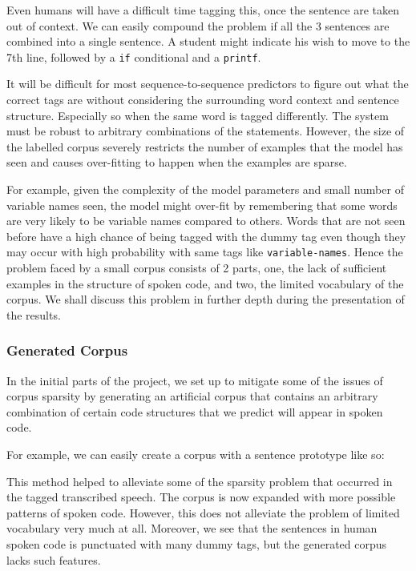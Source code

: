\documentclass[fyp]{socreport}
\begin{document}
Even humans will have a difficult time tagging this, once the sentence are
taken out of context. We can easily compound the problem if all the 3 sentences
are combined into a single sentence. A student might indicate his wish to move
to the 7th line, followed by a \texttt{if} conditional and a \texttt{printf}.

It will be difficult for most sequence-to-sequence predictors to figure out
what the correct tags are without considering the surrounding word context and
sentence structure. Especially so when the same word is tagged differently. The
system must be robust to arbitrary combinations of the statements. However, the
size of the labelled corpus severely restricts the number of examples that the
model has seen and causes over-fitting to happen when the examples are sparse.

For example, given the complexity of the model parameters and small number of
variable names seen, the model might over-fit by remembering that some words
are very likely to be variable names compared to others. Words that are not
seen before have a high chance of being tagged with the dummy tag even though
they may occur with high probability with same tags like
\texttt{variable-names}. Hence the problem faced by a small corpus consists of
2 parts, one, the lack of sufficient examples in the structure of spoken code,
and two, the limited vocabulary of the corpus.  We shall discuss this problem
in further depth during the presentation of the results.

\subsubsection{Generated Corpus}
In the initial parts of the project, we set up to mitigate some of the issues
of corpus sparsity by generating an artificial corpus that contains an arbitrary
combination of certain code structures that we predict will appear in spoken code.

For example, we can easily create a corpus with a sentence prototype like so:

\hspace{20pt}
   

This method helped to alleviate some of the sparsity problem that occurred in
the tagged transcribed speech. The corpus is now expanded with more possible
patterns of spoken code. However, this does not alleviate the problem of limited
vocabulary very much at all. Moreover, we see that the sentences in human spoken
code is punctuated with many dummy tags, but the generated corpus lacks such
features.
\end{document}
